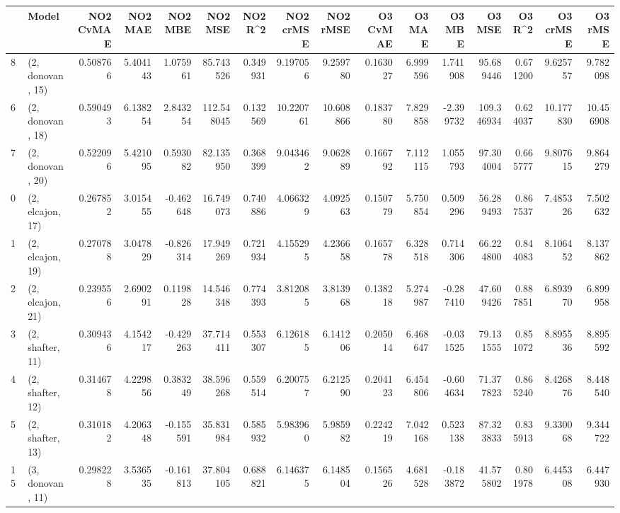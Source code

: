 \begin{tabular}{llrrrrrrrrrrrrrr}
\toprule
{} &             Model &  NO2 CvMAE &   NO2 MAE &   NO2 MBE &     NO2 MSE &   NO2 R\textasciicircum2 &  NO2 crMSE &   NO2 rMSE &  O3 CvMAE &    O3 MAE &    O3 MBE &      O3 MSE &    O3 R\textasciicircum2 &   O3 crMSE &    O3 rMSE \\
\midrule
8  &  (2, donovan, 15) &   0.508766 &  5.404143 &  1.075961 &   85.743526 &  0.349931 &   9.197056 &   9.259780 &  0.163027 &  6.999596 &  1.741908 &   95.689446 &  0.671200 &   9.625757 &   9.782098 \\
6  &  (2, donovan, 18) &   0.590493 &  6.138254 &  2.843254 &  112.548045 &  0.132569 &  10.220761 &  10.608866 &  0.183780 &  7.829858 & -2.399732 &  109.346934 &  0.624037 &  10.177830 &  10.456908 \\
7  &  (2, donovan, 20) &   0.522096 &  5.421095 &  0.593082 &   82.135950 &  0.368399 &   9.043462 &   9.062889 &  0.166792 &  7.112115 &  1.055793 &   97.304004 &  0.665777 &   9.807615 &   9.864279 \\
0  &  (2, elcajon, 17) &   0.267852 &  3.015455 & -0.462648 &   16.749073 &  0.740886 &   4.066329 &   4.092563 &  0.150779 &  5.750854 &  0.509296 &   56.289493 &  0.867537 &   7.485326 &   7.502632 \\
1  &  (2, elcajon, 19) &   0.270788 &  3.047829 & -0.826314 &   17.949269 &  0.721934 &   4.155295 &   4.236658 &  0.165778 &  6.328518 &  0.714306 &   66.224800 &  0.844083 &   8.106452 &   8.137862 \\
2  &  (2, elcajon, 21) &   0.239556 &  2.690291 &  0.119828 &   14.546348 &  0.774393 &   3.812085 &   3.813968 &  0.138218 &  5.274987 & -0.287410 &   47.609426 &  0.887851 &   6.893970 &   6.899958 \\
3  &  (2, shafter, 11) &   0.309436 &  4.154217 & -0.429263 &   37.714411 &  0.553307 &   6.126185 &   6.141206 &  0.205014 &  6.468647 & -0.031525 &   79.131555 &  0.851072 &   8.895536 &   8.895592 \\
4  &  (2, shafter, 12) &   0.314678 &  4.229856 &  0.383249 &   38.596268 &  0.559514 &   6.200757 &   6.212590 &  0.204123 &  6.454806 & -0.604634 &   71.377823 &  0.865240 &   8.426876 &   8.448540 \\
5  &  (2, shafter, 13) &   0.310182 &  4.206348 & -0.155591 &   35.831984 &  0.585932 &   5.983960 &   5.985982 &  0.224219 &  7.042168 &  0.523138 &   87.323833 &  0.835913 &   9.330068 &   9.344722 \\
15 &  (3, donovan, 11) &   0.298228 &  3.536535 & -0.161813 &   37.804105 &  0.688821 &   6.146375 &   6.148504 &  0.156526 &  4.681528 & -0.183872 &   41.575802 &  0.801978 &   6.445308 &   6.447930 \\

\end{tabular}

